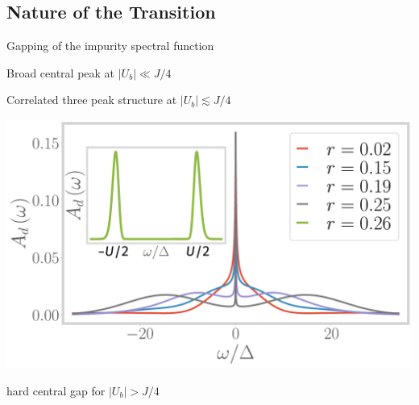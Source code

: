 \documentclass[8pt,aspectratio=169]{beamer}
\begin{document}
\begin{frame}{}
\section{Nature of the Transition}
\end{frame}

\begin{frame}{Gapping of the impurity spectral function}
\begin{minipage}{0.25\textwidth}
\begin{itemize}
\nitem Broad central peak at \(|U_b| \ll J/4\)
\end{itemize}
\end{minipage}
\hspace{\fill}
\begin{minipage}{0.45\textwidth}
\begin{itemize}
\nitem Correlated \alert{three peak} structure at \(|U_b| \lesssim J/4\)\\[10pt]
\end{itemize}
\includegraphics[width=\textwidth]{Add.pdf}
\end{minipage}
\hspace{\fill}
\begin{minipage}{0.25\textwidth}
\begin{itemize}
\nitem hard central \alert{gap} for  \(|U_b| > J/4\)
\end{itemize}
\end{minipage}

\end{frame}
\end{document}
